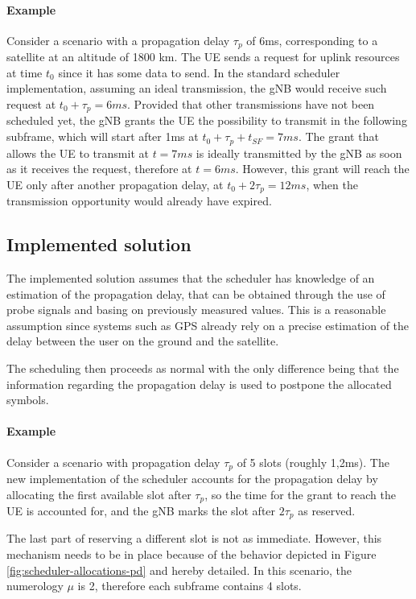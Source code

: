 \paragraph{Example} Consider a scenario with a propagation delay $\tau_p$ of 6ms, corresponding to a satellite at an altitude of 1800 km. The \ac{UE} sends a request for uplink resources at time $t_0$ since it has some data to send. In the standard scheduler implementation, assuming an ideal transmission, the \ac{gNB} would receive such request at $t_0+\tau_p=6\textit{ms}$. Provided that other transmissions have not been scheduled yet, the \ac{gNB} grants the \ac{UE} the possibility to transmit in the following subframe, which will start after 1ms at $t_0+\tau_p+t_{\textit{SF}}=7\textit{ms}$. The grant that allows the \ac{UE} to transmit at $t=7\textit{ms}$ is ideally transmitted by the \ac{gNB} as soon as it receives the request, therefore at $t=6\textit{ms}$. However, this grant will reach the \ac{UE} only after another propagation delay, at $t_0+2\tau_p=12\textit{ms}$, when the transmission opportunity would already have expired.

\subsection{Implemented solution}
\label{ss:propdelay-problem-sol}
The implemented solution assumes that the scheduler has knowledge of an estimation of the propagation delay, that can be obtained through the use of probe signals and basing on previously measured values. This is a reasonable assumption since systems such as GPS already rely on a precise estimation of the delay between the user on the ground and the satellite.

The scheduling then proceeds as normal with the only difference being that the information regarding the propagation delay is used to postpone the allocated symbols. 

\paragraph{Example} Consider a scenario with propagation delay $\tau_p$ of 5 slots (roughly 1,2ms). The new implementation of the scheduler accounts for the propagation delay by allocating the first available slot after $\tau_p$, so the time for the grant to reach the \ac{UE} is accounted for, and the \ac{gNB} marks the slot after $2\tau_p$ as reserved.

The last part of reserving a different slot is not as immediate. However, this mechanism needs to be in place because of the behavior depicted in Figure \ref{fig:scheduler-allocations-pd} and hereby detailed. In this scenario, the numerology $\mu$ is 2, therefore each subframe contains 4 slots.


